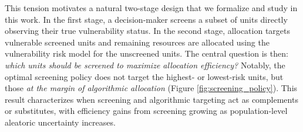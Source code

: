 This tension motivates a natural two-stage design that we formalize and study in this work. In the first stage, a decision-maker screens a subset of units directly observing their true vulnerability status. In the second stage, allocation targets vulnerable screened units and remaining resources are allocated using the vulnerability risk model for the unscreened units. The central question is then: \textit{which units should be screened to maximize allocation efficiency?} Notably, the optimal screening policy does not target the highest- or lowest-risk units, but those \textit{at the margin of algorithmic allocation} (Figure \ref{fig:screening_policy}). This result characterizes when screening and algorithmic targeting act as complements or substitutes, with efficiency gains from screening growing as population-level aleatoric uncertainty increases.


